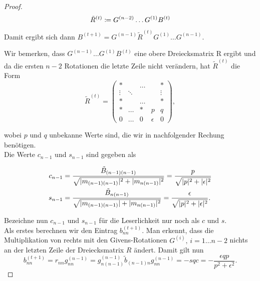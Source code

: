 \documentclass{article}
\begin{document}
\begin{proof}
	\begin{equation*}
		\tilde{R}^{(t)} \coloneqq G^{(n-2)} \dots G^{(1)} B^{(t)}\\
	\end{equation*}
	
	
	Damit ergibt sich dann $B^{(t+1)} = G^{(n-1)} \tilde{R}^{(t)} G^{(1)} \dots G^{(n-1)}$. 
	
	Wir bemerken, dass $G^{(n-1)} \dots G^{(1)} B^{(t)}$ eine obere Dreiecksmatrix R ergibt und da die ersten $n-2$ Rotationen die letzte Zeile nicht verändern, hat $\tilde{R}^{(t)}$ die Form
	\begin{equation}
		\tilde{R}^{(t)} = \left(\begin{array}{rrrrr}
			* & &\dots & & *\\
			\vdots & \ddots & & & \vdots\\
			* & &\dots & & *\\
			* & \dots&  *& p& q\\
			0 & \dots & 0 & \epsilon & 0
		\end{array}\right),
	\end{equation}

	wobei $p$ und $q$ unbekanne Werte sind, die wir in nachfolgender Rechung benötigen.\\
	Die Werte $c_{n-1}$ und $s_{n-1}$ sind gegeben als
	
	\begin{equation*}
		\begin{aligned}
			c_{n-1} &= \frac{\tilde{B}_{(n-1)(n-1)}}{\sqrt{|m_{(n-1)(n-1)}|^2 + |m_{n(n-1)}|^2}} = \frac{p}{\sqrt{|p|^2 +|\epsilon|^2}} \\ s_{n-1} &= \frac{\tilde{B}_{n(n-1)}}{\sqrt{|m_{(n-1)(n-1)}| + |m_{n(n-1)}|^2}} =  \frac{\epsilon}{\sqrt{|p|^2 +|\epsilon|^2}}.
		\end{aligned}\\
	\end{equation*}
	
	Bezeichne nun $c_{n-1}$ und $s_{n-1}$ für die Leserlichkeit nur noch als $c$ und $s$.\\

	Als erstes berechnen wir den Eintrag $b^{(t+1)}_{nn}$. Man erkennt, dass die Multiplikation von rechts mit den Givens-Rotationen $G^{(i)}, \, i = 1\dots n-2$ nichts an der letzten Zeile der Dreiecksmatrix $R$ ändert. Damit gilt nun
	\begin{equation*}
		b^{(t+1)}_{nn} = r_{nn} g^{(n-1)}_{nn} = g^{(n-1)}_{n(n-1)} \tilde{b}_{(n-1)n} g^{(n-1)}_{nn}  = -sqc = - \frac{\epsilon qp }{p^2+\epsilon^2}.
	\end{equation*}


\end{proof}
\end{document}
